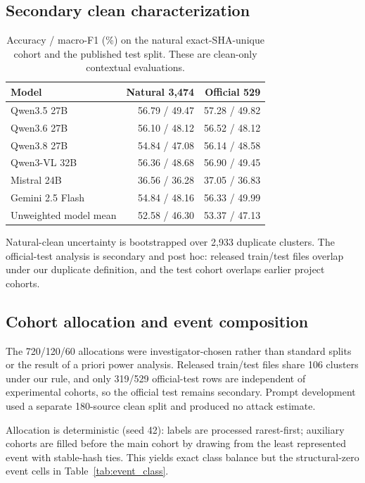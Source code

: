 \FloatBarrier
\subsection{Secondary clean characterization}
\label{app:secondaryclean}

\begin{table}[!htbp]
  \caption{Accuracy / macro-F1 (\%) on the natural exact-SHA-unique cohort and the published test split. These are clean-only contextual evaluations.}
  \label{tab:secondary_clean}
  \centering
  \small
  \begin{tabular}{lrr}
    \toprule
    Model & Natural 3,474 & Official 529 \\
    \midrule
    Qwen3.5 27B & 56.79 / 49.47 & 57.28 / 49.82 \\
    Qwen3.6 27B & 56.10 / 48.12 & 56.52 / 48.12 \\
    Qwen3.8 27B & 54.84 / 47.08 & 56.14 / 48.58 \\
    Qwen3-VL 32B & 56.36 / 48.68 & 56.90 / 49.45 \\
    Mistral 24B & 36.56 / 36.28 & 37.05 / 36.83 \\
    Gemini 2.5 Flash & 54.84 / 48.16 & 56.33 / 49.99 \\
    \midrule
    Unweighted model mean & 52.58 / 46.30 & 53.37 / 47.13 \\
    \bottomrule
  \end{tabular}
\end{table}

Natural-clean uncertainty is bootstrapped over 2,933 duplicate clusters. The official-test analysis is secondary and post hoc: released train/test files overlap under our duplicate definition, and the test cohort overlaps earlier project cohorts.

\subsection{Cohort allocation and event composition}
\label{app:cohorts}

The 720/120/60 allocations were investigator-chosen rather than standard splits or the result of a priori power analysis. Released train/test files share 106 clusters under our rule, and only 319/529 official-test rows are independent of experimental cohorts, so the official test remains secondary. Prompt development used a separate 180-source clean split and produced no attack estimate.

Allocation is deterministic (seed 42): labels are processed rarest-first; auxiliary cohorts are filled before the main cohort by drawing from the least represented event with stable-hash ties. This yields exact class balance but the structural-zero event cells in Table~\ref{tab:event_class}.

